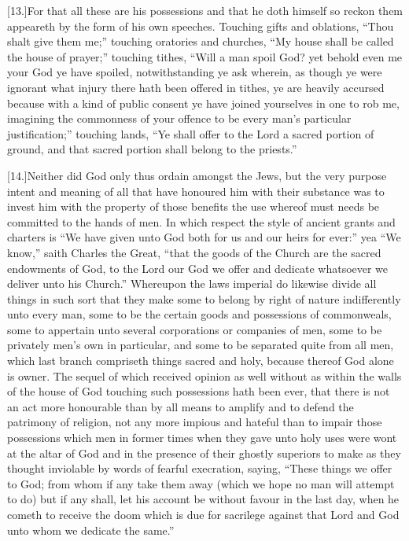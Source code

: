 [13.]For that all these are his possessions and that he doth himself so reckon them appeareth by the form of his own speeches. Touching gifts and oblations, “Thou shalt give them me;” touching oratories and churches, “My house shall be called the house of prayer;” touching tithes, “Will a man spoil God? yet behold even me your God ye have spoiled, notwithstanding ye ask wherein, as though ye were ignorant what injury there hath been offered in tithes, ye are heavily accursed because with a kind of public consent ye have joined yourselves in one to rob me, imagining the commonness of your offence to be every man’s particular justification;” touching lands, “Ye shall offer to the Lord a sacred portion of ground, and that sacred portion shall belong to the priests.”

[14.]Neither did God only thus ordain amongst the Jews, but the very purpose intent and meaning of all that have honoured him with their substance was to invest him with the property of those benefits the use whereof must needs be committed to the hands of men. In which respect the style of ancient grants and charters is “We have given unto God both for us and our heirs for ever:” yea “We know,” saith Charles the Great, “that the goods of the Church are the sacred endowments of God, to the Lord our God we offer and dedicate whatsoever we deliver unto his Church.” Whereupon the laws imperial do likewise divide all things in such sort that they make some to belong by right of nature indifferently unto every man, some to be the certain goods and possessions of commonweals, some to appertain unto several corporations or companies of men, some to be  privately men’s own in particular, and some to be separated quite from all men,
 which last branch compriseth things sacred and holy, because thereof God alone is owner. The sequel of which received opinion as well without as within the walls of the house of God touching such possessions hath been ever, that there is not an act more honourable than by all means to amplify and to defend the patrimony of religion, not any more impious and hateful than to impair those possessions which men in former times when they gave unto holy uses were wont at the altar of God and in the presence of their ghostly superiors to make as they thought inviolable by words of fearful execration, saying, “These things we offer to God; from whom if any take them away (which we hope no man will attempt to do) but if any shall, let his account be without favour in the last day, when he cometh to receive the doom which is due for sacrilege against that Lord and God unto whom we dedicate the same.”

